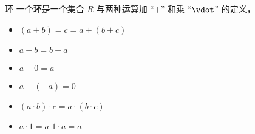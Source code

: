 
\begin{definition}{环}
一个\textbf{环}是一个集合 $R$ 与两种运算加 “$+$” 和乘 “$\vdot$” 的定义， 
\begin{itemize}
\item $(a + b) = c = a + (b + c)$
\item $a + b = b + a$
\item $a + 0 = a$
\item $a + (-a) = 0$
\item $(a\cdot b)\cdot c = a \cdot (b \cdot c)$
\item $a \cdot 1 = a$ $1 \cdot a = a$
\end{itemize}

\end{definition}